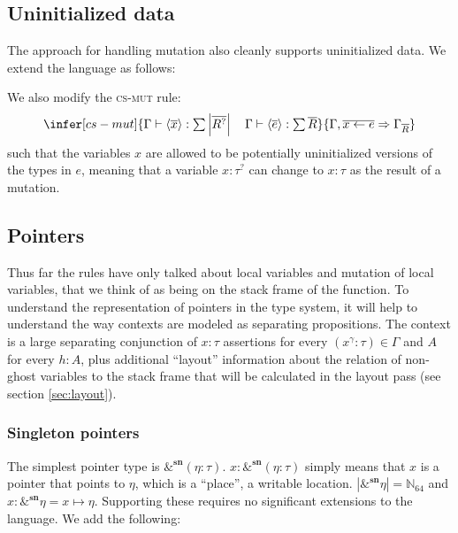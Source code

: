 \documentclass[acmsmall,nonacm]{acmart}
\newcommand*{\N}{\mathbb{N}}
\newcommand{\core}[1]{\left| #1 \right|}
\newcommand{\proves}{\vdash}
\newcommand{\constep}{\Rightarrow}
\begin{document}
\subsection{Uninitialized data}

The approach for handling mutation also cleanly supports uninitialized data. We extend the language as follows:

We also modify the \textsc{cs-mut} rule:
$$\infer[cs-mut]
    {\Gamma \proves \langle \overline{x}\rangle:\textstyle\sum\core{\overline{R^?}}\quad
      \Gamma \proves \langle \overline{e}\rangle:\textstyle\sum\overline{R}}
    {\Gamma,\overline{x\gets e} \constep\Gamma_{\overline{R}}}$$
such that the variables $x$ are allowed to be potentially uninitialized versions of the types in $e$, meaning that a variable $x:\tau^?$ can change to $x:\tau$ as the result of a mutation.

\subsection{Pointers}\label{sec:pointers}

Thus far the rules have only talked about local variables and mutation of local variables, that we think of as being on the stack frame of the function. To understand the representation of pointers in the type system, it will help to understand the way contexts are modeled as separating propositions. The context is a large separating conjunction of $\boxed{x:\tau}$ assertions for every $(x^\gamma:\tau)\in\Gamma$ and $A$ for every $h:A$, plus additional ``layout'' information about the relation of non-ghost variables to the stack frame that will be calculated in the layout pass (see section \ref{sec:layout}).

\subsubsection{Singleton pointers}

The simplest pointer type is $\&^\mathbf{sn}(\eta:\tau)$. $x:\&^\mathbf{sn}(\eta:\tau)$ simply means that $x$ is a pointer that points to $\eta$, which is a ``place'', a writable location. $\core{\&^\mathbf{sn}\eta}=\N_{64}$ and $\boxed{x:\&^\mathbf{sn}\eta}=x\mapsto \eta$. Supporting these requires no significant extensions to the language. We add the following:
\end{document}
